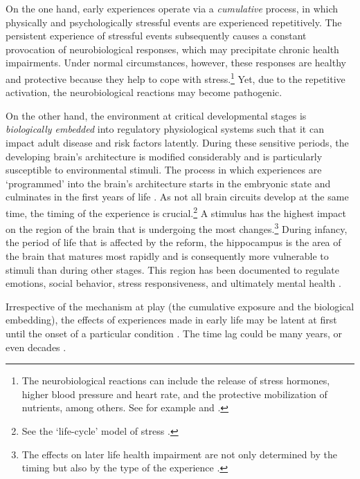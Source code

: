 On the one hand, early experiences operate via a \emph{cumulative} process, in which physically and psychologically stressful events are experienced repetitively. The persistent experience of stressful events subsequently causes a constant provocation of neurobiological responses, which may precipitate chronic health impairments. Under normal circumstances, however, these responses are healthy and protective because they help to cope with stress.\footnote{The neurobiological reactions can include the release of stress hormones, higher blood pressure and heart rate, and the protective mobilization of nutrients, among others. See for example \cite{mcewen1998stress} and \cite{shonkoff2009neuroscience}.} Yet, due to the repetitive activation, the neurobiological reactions may become pathogenic.

On the other hand, the environment at critical developmental stages is \emph{biologically embedded} into regulatory physiological systems such that it can impact adult disease and risk factors latently. During these sensitive periods, the developing brain's architecture is modified considerably and is particularly susceptible to environmental stimuli. The process in which experiences are `programmed' into the brain's architecture starts in the embryonic state and culminates in the first years of life \citep{raikkonen2012early}. As not all brain circuits develop at the same time, the timing of the experience is crucial.\footnote{See the `life-cycle' model of stress \citep{lupien2009effects}.} A stimulus has the highest impact on the region of the brain that is undergoing the most changes.\footnote{The effects on later life health impairment are not only determined by the timing but also by the type of the experience \citep{raikkonen2012early}.} During infancy, the period of life that is affected by the reform, the hippocampus is the area of the brain that matures most rapidly and is consequently more vulnerable to stimuli than during other stages. This region has been documented to regulate emotions, social behavior, stress responsiveness, and ultimately mental health \citep{center2016best,shonkoff2009neuroscience}. 

Irrespective of the mechanism at play (the cumulative exposure and the biological embedding), the effects of experiences made in early life may be latent at first until the onset of a particular condition \citep{almond2011fetalorigins}. The time lag could be many years, or even decades \citep{shonkoff2009neuroscience}.







